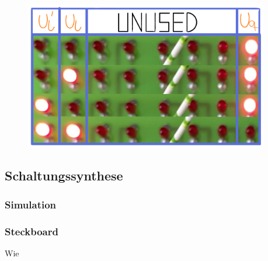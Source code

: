 \documentclass[12pt,english,ngerman]{scrartcl}
\begin{document}
\begin{figure}[H]
  \centering
    \includegraphics[width=0.95\textwidth]{./figures/messungen/WahrheitstabelleNAND.pdf}
  \caption{}
  \label{fig:mess_wahrheitstabelle_nand}
\end{figure}


\subsection{Schaltungssynthese}
\subsubsection{Simulation}


\begin{figure}[H]
  \centering
  \caption{}
  \label{fig:sim_aufbau_alarm}
\end{figure}




\subsubsection{Steckboard}
Wie  

\end{document}
